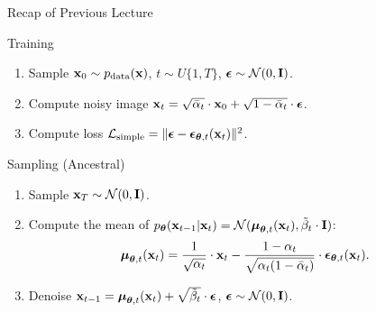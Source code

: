 \documentclass{beamer}
\begin{document}
\begin{frame}{Recap of Previous Lecture}
	\begin{block}{Training}
		\begin{enumerate}
			\item Sample $\mathbf{x}_0 \sim p_{\text{data}}(\mathbf{x})$, $t \sim U\{1, T\}$, $\boldsymbol{\epsilon} \sim \mathcal{N}(0, \mathbf{I})$.
			\item Compute noisy image $\mathbf{x}_t = \sqrt{\bar{\alpha}_t} \cdot \mathbf{x}_0 + \sqrt{1 - \bar{\alpha}_t} \cdot \boldsymbol{\epsilon}$.
			\item Compute loss $ \mathcal{L}_{\text{simple}} = \| \boldsymbol{\epsilon} - \boldsymbol{\epsilon}_{\boldsymbol{\theta}, t}(\mathbf{x}_t) \|^2 $.
		\end{enumerate}
	\end{block}
	\begin{block}{Sampling (Ancestral)}
		\begin{enumerate}
			\item Sample $\mathbf{x}_T \sim \mathcal{N}(0, \mathbf{I})$.
			\item Compute the mean of $p_{\boldsymbol{\theta}}(\mathbf{x}_{t-1} | \mathbf{x}_t) = \mathcal{N}(\boldsymbol{\mu}_{\boldsymbol{\theta}, t}(\mathbf{x}_t), \tilde{\beta}_t \cdot \mathbf{I})$:
			\vspace{-0.3cm}
			\[
				\boldsymbol{\mu}_{\boldsymbol{\theta}, t}(\mathbf{x}_t) = \frac{1}{\sqrt{\alpha_t}} \cdot \mathbf{x}_t - \frac{1 - \alpha_t}{\sqrt{\alpha_t (1 - \bar{\alpha}_t)}} \cdot \boldsymbol{\epsilon}_{\boldsymbol{\theta}, t}(\mathbf{x}_t).
			\]
			\vspace{-0.5cm}
			\item Denoise $\mathbf{x}_{t - 1} = \boldsymbol{\mu}_{\boldsymbol{\theta}, t}(\mathbf{x}_t) +  \sqrt{\tilde{\beta}_t} \cdot \boldsymbol{\epsilon}$, $\boldsymbol{\epsilon} \sim \mathcal{N}(0, \mathbf{I})$.
		\end{enumerate}
	\end{block}
\end{frame}
\end{document}
